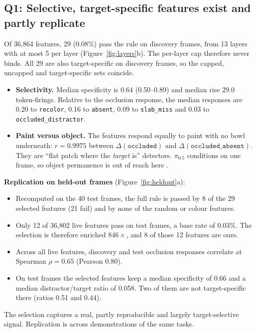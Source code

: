\documentclass{article} %
\newcommand{\pifive}{$\pi_{0.5}$}
\newcommand{\occ}{\texttt{occluded}}
\newcommand{\cond}[1]{\texttt{#1}}
\begin{document}
\subsection{Q1: Selective, target-specific features exist and partly replicate}
\label{sec:q1}
Of 36,864 features, 29 (0.08\%) pass the rule on discovery frames, from 13 layers with at most 5 per layer (Figure~\ref{fig:layers}b). The per-layer cap therefore never binds. All 29 are also target-specific on discovery frames, so the capped, uncapped and target-specific sets coincide.
\begin{itemize}[leftmargin=*,itemsep=0pt,topsep=1pt]
  \item \textbf{Selectivity.} Median specificity is 0.64 (0.50--0.89) and median rise 29.0 token-firings. Relative to the occlusion response, the median responses are 0.20 to \cond{recolor}, 0.16 to \cond{absent}, 0.09 to \cond{slab\_miss} and 0.03 to \cond{occluded\_distractor}.
  \item \textbf{Paint versus object.} The features respond equally to paint with no bowl underneath: $r{=}0.9975$ between $\Delta(\occ)$ and $\Delta(\cond{occluded\_absent})$. They are ``flat patch where the \emph{target} is'' detectors. \pifive{} conditions on one frame, so object permanence is out of reach here \citep{baillargeon1985object}.
\end{itemize}

\textbf{Replication on held-out frames} (Figure~\ref{fig:heldout}a):
\begin{itemize}[leftmargin=*,itemsep=0pt,topsep=1pt]
  \item Recomputed on the 40 test frames, the full rule is passed by 8 of the 29 selected features (21 fail) and by none of the random or colour features.
  \item Only 12 of 36,802 live features pass on test frames, a base rate of 0.03\%. The selection is therefore enriched $846\times$, and 8 of those 12 features are ours.
  \item Across all live features, discovery and test occlusion responses correlate at Spearman $\rho{=}0.65$ (Pearson 0.80).
  \item On test frames the selected features keep a median specificity of 0.66 and a median distractor/target ratio of 0.058. Two of them are not target-specific there (ratios 0.51 and 0.44).
\end{itemize}
The selection captures a real, partly reproducible and largely target-selective signal. Replication is across demonstrations of the same tasks.
\end{document}
